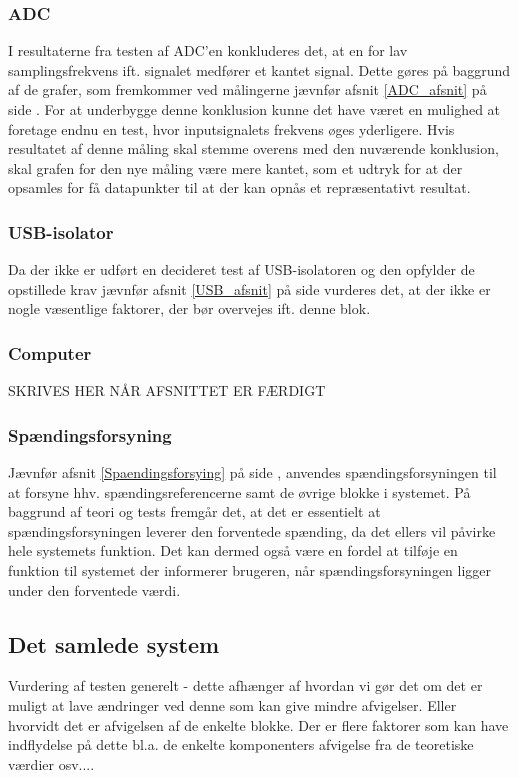\subsubsection{ADC}
I resultaterne fra testen af ADC'en konkluderes det, at en for lav samplingsfrekvens ift. signalet medfører et kantet signal. Dette gøres på baggrund af de grafer, som fremkommer ved målingerne jævnfør afsnit \ref{ADC_afsnit} på side \pageref{ADC_afsnit}. For at underbygge denne konklusion kunne det have været en mulighed at foretage endnu en test, hvor inputsignalets frekvens øges yderligere. Hvis resultatet af denne måling skal stemme overens med den nuværende konklusion, skal grafen for den nye måling være mere kantet, som et udtryk for at der opsamles for få datapunkter til at der kan opnås et repræsentativt resultat.

\subsubsection{USB-isolator}
Da der ikke er udført en decideret test af USB-isolatoren og den opfylder de opstillede krav jævnfør afsnit \ref{USB_afsnit} på side \pageref{USB_afsnit} vurderes det, at der ikke er nogle væsentlige faktorer, der bør overvejes ift. denne blok.

\subsubsection{Computer}
SKRIVES HER NÅR AFSNITTET ER FÆRDIGT

\subsubsection{Spændingsforsyning}
Jævnfør afsnit \ref{Spaendingsforsying} på side \pageref{Spaendingsforsying}, anvendes spændingsforsyningen til at forsyne hhv. spændingsreferencerne samt de øvrige blokke i systemet. På baggrund af teori og tests fremgår det, at det er essentielt at spændingsforsyningen leverer den forventede spænding, da det ellers vil påvirke hele systemets funktion. Det kan dermed også være en fordel at tilføje en funktion til systemet der informerer brugeren, når spændingsforsyningen ligger under den forventede værdi. 

 
\subsection{Det samlede system}
Vurdering af testen generelt - dette afhænger af hvordan vi gør det om det er muligt at lave ændringer ved denne som kan give mindre afvigelser. Eller hvorvidt det er afvigelsen af de enkelte blokke. Der er flere faktorer som kan have indflydelse på dette bl.a. de enkelte komponenters afvigelse fra de teoretiske værdier osv....